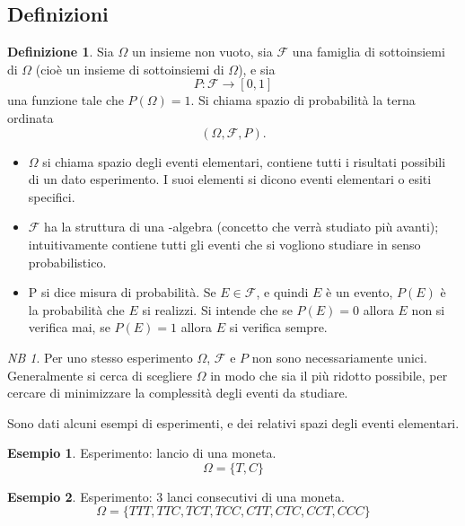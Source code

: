 \documentclass{article}
\theoremstyle{plain}
\theoremstyle{definition}
\newtheorem{definizione}{Definizione}[section]
\newtheorem{esempio}{Esempio}[section]
\theoremstyle{remark}
\newtheorem*{NB}{NB}
\begin{document}
\subsection{Definizioni} %
\label{sub:definizioni}
\begin{definizione}
	Sia $\Omega$ un insieme non vuoto, sia $\mathscr{F}$ una famiglia di sottoinsiemi di $\Omega$ (cioè un insieme di sottoinsiemi di $\Omega$), e sia
	\begin{equation*}
		P:\mathscr{F}\to[0,1]
	\end{equation*}
	una funzione tale che $P(\Omega)=1$. Si chiama spazio di probabilità la terna ordinata
	\begin{equation*}
		(\Omega,\mathscr{F},P)\text{.}
	\end{equation*}
\end{definizione}
\begin{itemize}
	\item $\Omega$ si chiama spazio degli eventi elementari, contiene tutti i risultati possibili di un dato esperimento. I suoi elementi si dicono eventi elementari o esiti specifici.
	\item $\mathscr{F}$ ha la struttura di una \sigma-algebra (concetto che verrà studiato più avanti); intuitivamente contiene tutti gli eventi che si vogliono studiare in senso probabilistico.
	\item P si dice misura di probabilità. Se $E\in\mathscr{F}$, e quindi $E$ è un evento, $P(E)$ è la probabilità che $E$ si realizzi. Si intende che se $P(E)=0$ allora $E$ non si verifica mai, se $P(E)=1$ allora $E$ si verifica sempre.
\end{itemize}
\begin{NB}
	Per uno stesso esperimento $\Omega$, $\mathscr{F}$ e $P$ non sono necessariamente unici. Generalmente si cerca di scegliere $\Omega$ in modo che sia il più ridotto possibile, per cercare di minimizzare la complessità degli eventi da studiare.
\end{NB}
Sono dati alcuni esempi di esperimenti, e dei relativi spazi degli eventi elementari.
\begin{esempio}
	Esperimento: lancio di una moneta.
	\begin{equation*}
		\Omega=\{T,C\}
	\end{equation*}
\end{esempio}
\begin{esempio}
	Esperimento: 3 lanci consecutivi di una moneta.
	\begin{equation*}
		\Omega=\{TTT, TTC, TCT, TCC, CTT, CTC, CCT, CCC\}
	\end{equation*}
\end{esempio}
\end{document}
